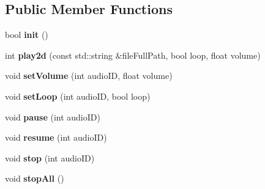 \subsection*{Public Member Functions}
\begin{DoxyCompactItemize}
\item 
\mbox{\label{classexperimental_1_1AudioEngineImpl_a908e5136201a8a6b53ae5c292329f82b}} 
bool {\bfseries init} ()
\item 
\mbox{\label{classexperimental_1_1AudioEngineImpl_a04b788a8319f5d7f90e297a2a345f745}} 
int {\bfseries play2d} (const std\+::string \&file\+Full\+Path, bool loop, float volume)
\item 
\mbox{\label{classexperimental_1_1AudioEngineImpl_aaa11ae7fe8bfd4c4365c02aa71f119b0}} 
void {\bfseries set\+Volume} (int audio\+ID, float volume)
\item 
\mbox{\label{classexperimental_1_1AudioEngineImpl_afd6600a03fa747d44c79f09fbc41b373}} 
void {\bfseries set\+Loop} (int audio\+ID, bool loop)
\item 
\mbox{\label{classexperimental_1_1AudioEngineImpl_a9c4026caed1c625774d3fd1e2114322a}} 
void {\bfseries pause} (int audio\+ID)
\item 
\mbox{\label{classexperimental_1_1AudioEngineImpl_ad180e0563cfb6944074a19304152d990}} 
void {\bfseries resume} (int audio\+ID)
\item 
\mbox{\label{classexperimental_1_1AudioEngineImpl_a56856900e92d2a4c19ea1a629bf19393}} 
void {\bfseries stop} (int audio\+ID)
\item 
\mbox{\label{classexperimental_1_1AudioEngineImpl_abcf87e42d6015ae5a0760ce815fb6f28}} 
void {\bfseries stop\+All} ()
\item 
\mbox{\label{classexperimental_1_1AudioEngineImpl_a12fa2f700f4d6e4effc72e1ad7e030cb}} 

\end{DoxyCompactItemize}
